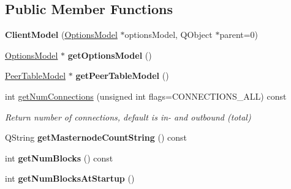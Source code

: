 \subsection*{Public Member Functions}
\begin{DoxyCompactItemize}
\item 
\mbox{\label{class_client_model_aec1d32d5dc8c094eba66036a19a22854}} 
{\bfseries Client\+Model} (\mbox{\hyperlink{class_options_model}{Options\+Model}} $\ast$options\+Model, Q\+Object $\ast$parent=0)
\item 
\mbox{\label{class_client_model_ae8da1e2eabfbbcc49a7eed821908bdb6}} 
\mbox{\hyperlink{class_options_model}{Options\+Model}} $\ast$ {\bfseries get\+Options\+Model} ()
\item 
\mbox{\label{class_client_model_a643fc112ce94f50ac7187ecdf3c75360}} 
\mbox{\hyperlink{class_peer_table_model}{Peer\+Table\+Model}} $\ast$ {\bfseries get\+Peer\+Table\+Model} ()
\item 
\mbox{\label{class_client_model_ab1a71928e2ff3902e854d301f4cfe6ef}} 
int \mbox{\hyperlink{class_client_model_ab1a71928e2ff3902e854d301f4cfe6ef}{get\+Num\+Connections}} (unsigned int flags=C\+O\+N\+N\+E\+C\+T\+I\+O\+N\+S\+\_\+\+A\+LL) const
\begin{DoxyCompactList}\small\item\em Return number of connections, default is in-\/ and outbound (total) \end{DoxyCompactList}\item 
\mbox{\label{class_client_model_ab8dae86e417c050723fee66420a333ed}} 
Q\+String {\bfseries get\+Masternode\+Count\+String} () const
\item 
\mbox{\label{class_client_model_a9af729ddd1220f928d8cb3ef29f06f26}} 
int {\bfseries get\+Num\+Blocks} () const
\item 
\mbox{\label{class_client_model_a6bc7b2b076e7d4f999f189b6db74d909}} 
int {\bfseries get\+Num\+Blocks\+At\+Startup} ()
\item 
\mbox{\label{class_client_model_a3ecd021e48073debd6dfeb90fdb3e7bd}} 

\end{DoxyCompactItemize}
